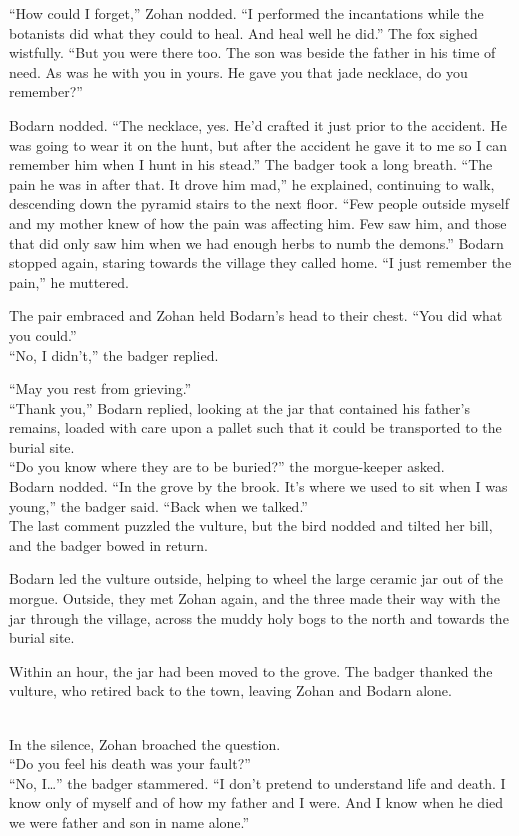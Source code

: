 ``How could I forget,'' Zohan nodded. ``I performed the incantations while the botanists did what they could to heal. And heal well he did.'' The fox sighed wistfully. ``But you were there too. The son was beside the father in his time of need. As was he with you in yours. He gave you that jade necklace, do you remember?''

Bodarn nodded. ``The necklace, yes. He'd crafted it just prior to the accident. He was going to wear it on the hunt, but after the accident he gave it to me so I can remember him when I hunt in his stead.'' The badger took a long breath. ``The pain he was in after that. It drove him mad,'' he explained, continuing to walk, descending down the pyramid stairs to the next floor. ``Few people outside myself and my mother knew of how the pain was affecting him. Few saw him, and those that did only saw him when we had enough herbs to numb the demons.'' Bodarn stopped again, staring towards the village they called home. ``I just remember the pain,'' he muttered.

The pair embraced and Zohan held Bodarn's head to their chest. ``You did what you could.''\\
``No, I didn't,'' the badger replied.

\secdiv

``May you rest from grieving.''\\
``Thank you,'' Bodarn replied, looking at the jar that contained his father's remains, loaded with care upon a pallet such that it could be transported to the burial site.\\
``Do you know where they are to be buried?'' the morgue-keeper asked.\\
Bodarn nodded. ``In the grove by the brook. It's where we used to sit when I was young,'' the badger said. ``Back when we talked.''\\
The last comment puzzled the vulture, but the bird nodded and tilted her bill, and the badger bowed in return.

Bodarn led the vulture outside, helping to wheel the large ceramic jar out of the morgue. Outside, they met Zohan again, and the three made their way with the jar through the village, across the muddy holy bogs to the north and towards the burial site.

\secdiv

Within an hour, the jar had been moved to the grove. The badger thanked the vulture, who retired back to the town, leaving Zohan and Bodarn alone.\\
\strut \\
In the silence, Zohan broached the question.\\
``Do you feel his death was your fault?''\\
``No, I\ldots'' the badger stammered. ``I don't pretend to understand life and death. I know only of myself and of how my father and I were. And I know when he died we were father and son in name alone.''

